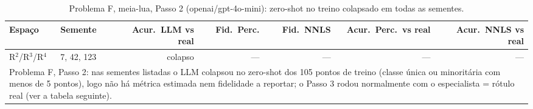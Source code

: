 \begin{table}[htbp]
\centering
\small
\caption{Problema F, meia-lua, Passo 2 (openai/gpt-4o-mini): zero-shot no treino colapsado em todas as sementes.}
\label{tab:bloco2_F_passo2_R2_R3_R4_gpt4mini}
\begin{tabular}{llrrrrr}
\toprule
Espaço & Semente & Acur.\ LLM vs real & Fid.\ Perc. & Fid.\ NNLS & Acur.\ Perc.\ vs real & Acur.\ NNLS vs real \\
\midrule
R$^2$/R$^3$/R$^4$ & 7, 42, 123 & colapso & — & — & — & — \\
\bottomrule
\multicolumn{7}{p{0.95\linewidth}}{\footnotesize Problema F, Passo 2: nas sementes listadas o LLM colapsou no zero-shot dos 105 pontos de treino (classe única ou minoritária com menos de 5 pontos), logo não há métrica estimada nem fidelidade a reportar; o Passo 3 rodou normalmente com o especialista = rótulo real (ver a tabela seguinte).} \\
\end{tabular}
\end{table}
